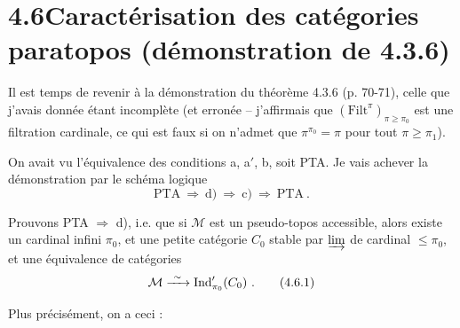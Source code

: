 \section*{4.6\quad Caractérisation des catégories paratopos (démonstration de 4.3.6)}

Il est temps de revenir à la démonstration du théorème 4.3.6 (p. 70-71), celle que j'avais donnée étant incomplète (et erronée – j'affirmais que $(\mathrm{Filt}^{\pi})_{\pi\geqslant\pi_0}$ est une filtration cardinale, ce qui est faux si on n'admet que $\pi^{\pi_0}=\pi$ pour tout $\pi\geqslant\pi_1$).

On avait vu l'équivalence des conditions a, a$'$, b, soit PTA. Je vais achever la démonstration par le schéma logique
\[
\text{PTA} \ \Longrightarrow\ \text{d)} \ \Longrightarrow\ \text{c)} \ \Longrightarrow\ \text{PTA}\ . \tag*{$(*)$}
\]

Prouvons PTA $\Longrightarrow$ d), i.e. que si $\mathcal{M}$ est un pseudo-topos accessible, alors existe un cardinal infini $\pi_0$, et une petite catégorie $C_0$ stable par $\varinjlim$ de cardinal $\leqslant\pi_0$, et une équivalence de catégories %
\[
\mathcal{M} \xrightarrow{\ \sim\ } \operatorname{Ind}'_{\pi_0}(C_0)\ . \tag*{(4.6.1)}
\]

Plus précisément, on a ceci :

